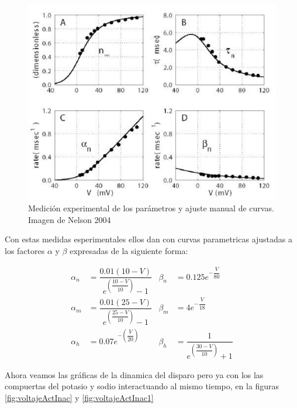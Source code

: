 \begin{figure}[h]
 \centering
 \includegraphics[scale=0.5]{../Figuras/medidasExperimentales.png}
 \caption{Medición experimental de los parámetros y ajuste manual de curvas. Imagen de Nelson 2004}
 \label{fig:voltajeAB}
\end{figure}

Con estas medidas esperimentales ellos dan con curvas parametricas ajustadas a los factores \(\alpha\) y \(\beta\) expresadas de la siguiente forma:

\begin{align*}
\alpha_{n}&=\dfrac{0.01(10-V)}{e^{\left(\dfrac{10-V}{10}\right)}-1}           &  \beta_{n}&=0.125e^{-\dfrac{V}{80}}\\
\alpha_{m}&=\dfrac{0.01(25-V)}{e^{\left(\dfrac{25-V}{10}\right)}-1}                    &  \beta_{m}&=4e^{-\dfrac{V}{18}}\\
\alpha_{h}&=0.07 e^{-\left(\dfrac{V}{20}\right)}              &  \beta_{h}&=\dfrac{1}{e^{\left(\dfrac{30-V}{10}\right)}+1}
\label{eq:curvas}
\end{align*}

Ahora veamos las gráficas de la dinamica del disparo pero ya con los las compuertas del potasio y sodio interactuando al mismo tiempo, en la figuras \ref{fig:voltajeActInac} y \ref{fig:voltajeActInac1}

